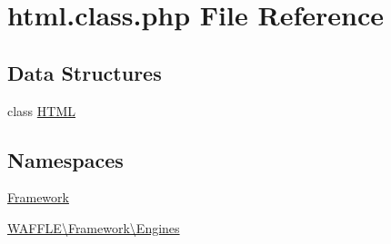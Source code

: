 \hypertarget{html_8class_8php}{}\section{html.\+class.\+php File Reference}
\label{html_8class_8php}
\subsection*{Data Structures}
\begin{DoxyCompactItemize}
\item 
class \hyperlink{class_w_a_f_f_l_e_1_1_framework_1_1_engines_1_1_h_t_m_l}{H\+T\+ML}
\end{DoxyCompactItemize}
\subsection*{Namespaces}
\begin{DoxyCompactItemize}
\item 
 \hyperlink{namespace_framework}{Framework}
\item 
 \hyperlink{namespace_w_a_f_f_l_e_1_1_framework_1_1_engines}{W\+A\+F\+F\+L\+E\textbackslash{}\+Framework\textbackslash{}\+Engines}
\end{DoxyCompactItemize}
